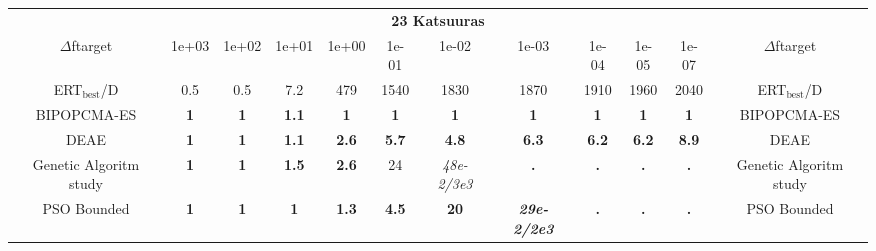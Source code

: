 \begin{tabular}{cccccccccccc}
 & \multicolumn{10}{c}{{\normalsize \textbf{23 Katsuuras}}}\\
$\Delta$ftarget& 1e+03& 1e+02& 1e+01& 1e+00& 1e-01& 1e-02& 1e-03& 1e-04& 1e-05& 1e-07 & $\Delta$ftarget \\
ERT$_{\textrm{best}}$/D& 0.5& 0.5& 7.2& 479& 1540& 1830& 1870& 1910& 1960& 2040 & ERT$_{\textrm{best}}$/D \\
\hline
BIPOPCMA-ES & \textbf{1} & \textbf{1} & \textbf{1.1} & \textbf{1} & \textbf{1} & \textbf{1} & \textbf{1} & \textbf{1} & \textbf{1} & \textbf{1} & BIPOPCMA-ES \cite{add_an_entry_for_BIPOPCMA-ES_in_bbob.bib}\\
DEAE & \textbf{1} & \textbf{1} & \textbf{1.1} & \textbf{2.6} & \textbf{5.7} & \textbf{4.8} & \textbf{6.3} & \textbf{6.2} & \textbf{6.2} & \textbf{8.9} & DEAE \cite{add_an_entry_for_DEAE_in_bbob.bib}\\
Genetic Algoritm study & \textbf{1} & \textbf{1} & \textbf{1.5} & \textbf{2.6} & 24 & \textit{48e-2}\textit{/3e3} & \textbf{.} & \textbf{.} & \textbf{.} & \textbf{.} & Genetic Algoritm study \cite{add_an_entry_for_Genetic Algoritm study_in_bbob.bib}\\
PSO Bounded & \textbf{1} & \textbf{1} & \textbf{1} & \textbf{1.3} & \textbf{4.5} & \textbf{20} & \textbf{\textit{29e-2}\textit{/2e3}} & \textbf{.} & \textbf{.} & \textbf{.} & PSO Bounded \cite{add_an_entry_for_PSO Bounded_in_bbob.bib}
\end{tabular}
